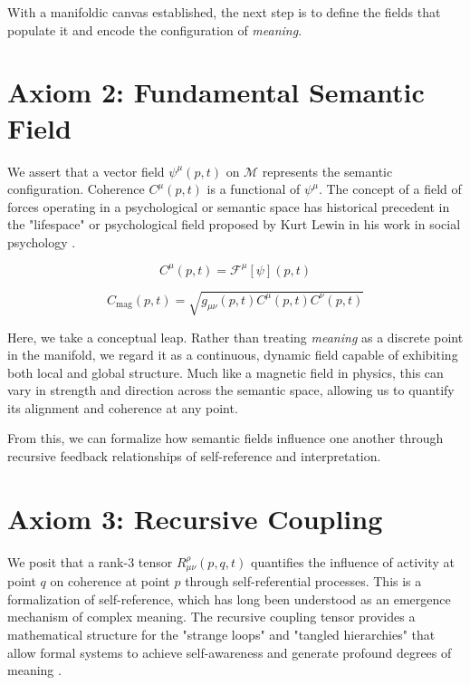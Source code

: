 With a manifoldic canvas established, the next step is to define the fields that populate it and encode the configuration of \textit{meaning}.


\section{Axiom 2: Fundamental Semantic Field}
\label{1.2:axiom_2_fundamental_semantic_field}

We assert that a vector field \(\psi^\mu(p,t)\) on \(\mathcal{M}\) represents the semantic configuration. Coherence \(C^\mu(p,t)\) is a functional of \(\psi^\mu\). The concept of a field of forces operating in a psychological or semantic space has historical precedent in the "lifespace" or psychological field proposed by Kurt Lewin in his work in social psychology \autocite{Lewin1951}.

\begin{equation}
C^\mu(p,t) = \mathcal{F}^\mu[\psi](p,t)
\end{equation}

\begin{equation}
C_{\text{mag}}(p,t) = \sqrt{g_{\mu\nu}(p,t) C^\mu(p,t) C^\nu(p,t)}
\end{equation}

Here, we take a conceptual leap. Rather than treating \textit{meaning} as a discrete point in the manifold, we regard it as a continuous, dynamic field capable of exhibiting both local and global structure. Much like a magnetic field in physics, this can vary in strength and direction across the semantic space, allowing us to quantify its alignment and coherence at any point.

From this, we can formalize how semantic fields influence one another through recursive feedback relationships of self-reference and interpretation.


\section{Axiom 3: Recursive Coupling}
\label{1.3:axiom_3_recursive_coupling}

We posit that a rank-3 tensor \(R^\rho_{\mu\nu}(p,q,t)\) quantifies the influence of activity at point \(q\) on coherence at point \(p\) through self-referential processes. This is a formalization of self-reference, which has long been understood as an emergence mechanism of complex meaning. The recursive coupling tensor provides a mathematical structure for the "strange loops" and "tangled hierarchies" that allow formal systems to achieve self-awareness and generate profound degrees of meaning \autocite{Hofstadter1979}.

